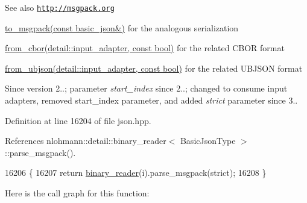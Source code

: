 \begin{DoxySeeAlso}{See also}
\href{http://msgpack.org}{\tt http\+://msgpack.\+org} 

\hyperlink{classnlohmann_1_1basic__json_a09ca1dc273d226afe0ca83a9d7438d9c}{to\+\_\+msgpack(const basic\+\_\+json\&)} for the analogous serialization 

\hyperlink{classnlohmann_1_1basic__json_aa9be366b887378bb10c0f1ab510c2f0c}{from\+\_\+cbor(detail\+::input\+\_\+adapter, const bool)} for the related C\+B\+OR format 

\hyperlink{classnlohmann_1_1basic__json_afc590e292274a032cb0142d27778738e}{from\+\_\+ubjson(detail\+::input\+\_\+adapter, const bool)} for the related U\+B\+J\+S\+ON format
\end{DoxySeeAlso}
\begin{DoxySince}{Since}
version 2..; parameter {\itshape start\+\_\+index} since 2..; changed to consume input adapters, removed start\+\_\+index parameter, and added {\itshape strict} parameter since 3.. 
\end{DoxySince}


Definition at line 16204 of file json.\+hpp.



References nlohmann\+::detail\+::binary\+\_\+reader$<$ Basic\+Json\+Type $>$\+::parse\+\_\+msgpack().


\begin{DoxyCode}
16206     \{
16207         \textcolor{keywordflow}{return} \hyperlink{classnlohmann_1_1basic__json_a7e06ed27ff517575ccb23fc23fca2b8f}{binary\_reader}(i).parse\_msgpack(strict);
16208     \}
\end{DoxyCode}
Here is the call graph for this function\+:
\mbox{\label{classnlohmann_1_1basic__json_ad435a9e5851197bb8e3d727faf10abc5}} 
